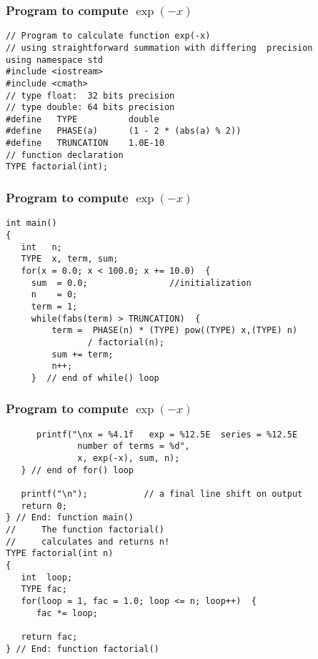 \documentclass{beamer}
\newenvironment{block_mdfboxadmon}[1][]{\begin{block}{#1}}{\end{block}}
\begin{document}
\begin{frame}
\frametitle{Program to compute $\exp{(-x)}$}

\begin{block_mdfboxadmon}
\begin{verbatim}
// Program to calculate function exp(-x)
// using straightforward summation with differing  precision
using namespace std
#include <iostream>
#include <cmath>
// type float:  32 bits precision
// type double: 64 bits precision
#define   TYPE          double
#define   PHASE(a)      (1 - 2 * (abs(a) % 2))
#define   TRUNCATION    1.0E-10
// function declaration
TYPE factorial(int);
\end{verbatim}
\end{block_mdfboxadmon}
\end{frame}

\begin{frame}
\frametitle{Program to compute $\exp{(-x)}$}

\begin{block_mdfboxadmon}
\begin{verbatim}
int main()
{
   int   n;
   TYPE  x, term, sum;
   for(x = 0.0; x < 100.0; x += 10.0)  {
     sum  = 0.0;                //initialization
     n    = 0;
     term = 1;
     while(fabs(term) > TRUNCATION)  {
         term =  PHASE(n) * (TYPE) pow((TYPE) x,(TYPE) n)
                / factorial(n);
         sum += term;
         n++;
     }  // end of while() loop
\end{verbatim}
\end{block_mdfboxadmon}
\end{frame}

\begin{frame}
\frametitle{Program to compute $\exp{(-x)}$}

\begin{block_mdfboxadmon}
\begin{verbatim}
      printf("\nx = %4.1f   exp = %12.5E  series = %12.5E
              number of terms = %d",
              x, exp(-x), sum, n);
   } // end of for() loop

   printf("\n");           // a final line shift on output
   return 0;
} // End: function main()
//     The function factorial()
//     calculates and returns n!
TYPE factorial(int n)
{
   int  loop;
   TYPE fac;
   for(loop = 1, fac = 1.0; loop <= n; loop++)  {
      fac *= loop;

   return fac;
} // End: function factorial()
\end{verbatim}
\end{block_mdfboxadmon}
\end{frame}
\end{document}
